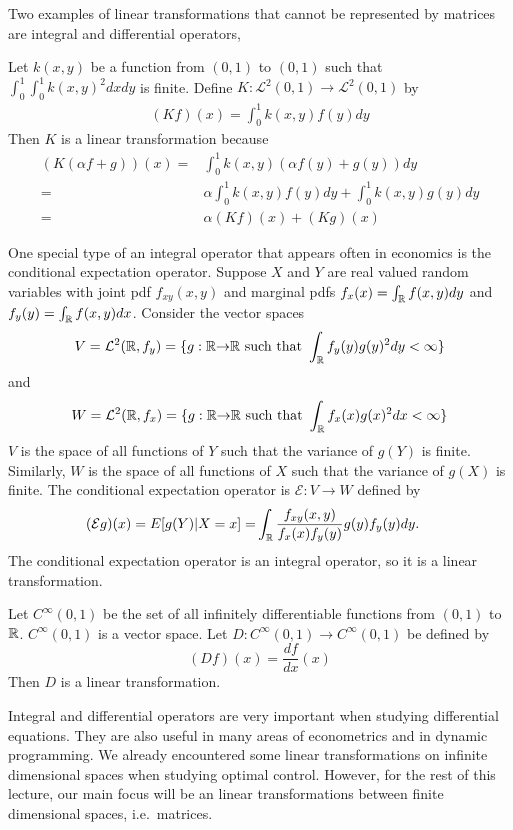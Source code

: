 Two examples of linear transformations that cannot be represented by
matrices are integral and differential operators,
\begin{example}
  Let $k(x,y)$ be a function from $(0,1)$ to $(0,1)$ such that
  $\int_0^1 \int_0^1 k(x,y)^2 dx dy$ is finite.  Define
  $K:\mathcal{L}^2(0,1) \rightarrow \mathcal{L}^2(0,1)$ by
  \begin{align*}
    (K f) (x) = \int_0^1 k(x,y) f(y) dy
  \end{align*}
  Then $K$ is a linear transformation because
  \begin{align*}
    (K ( \alpha f + g) ) (x) = & \int_0^1 k(x,y) (\alpha f(y) + g(y))dy
    \\
    = & \alpha \int_0^1 k(x,y) f(y) dy + \int_0^1 k(x,y) g(y)dy \\
    = & \alpha (K f) (x) + (K g)(x) 
  \end{align*}      
\end{example}

\begin{example}
  One special type of an integral operator that appears often in
  economics is the conditional expectation operator. Suppose $X$ and
  $Y$ are real valued random variables with joint pdf $f_{xy}(x,y)$
  and marginal pdfs $f_x(x) = \int_{\mathbb{R}} f(x,y) dy$ and $f_y(y) = \int_{\mathbb{R}}
  f(x,y) dx$. Consider the vector spaces 
  \[ 
  V = \mathcal{L}^2(\mathbb{R},f_y) = \{g:
  \mathbb{R} {\rightarrow} \mathbb{R} \text{ such that } \int_{\mathbb{R}} f_y(y) g(y)^2 dy <
  \infty \} \]
  and 
  \[ 
  W = \mathcal{L}^2(\mathbb{R},f_x) = \{g:
  \mathbb{R} {\rightarrow} \mathbb{R} \text{ such that } \int_{\mathbb{R}} f_x(x) g(x)^2 dx <
  \infty \} 
  \]  
  $V$ is the space of all functions of $Y$ such that the variance of
  $g(Y)$ is finite. Similarly, $W$ is the space of all functions of
  $X$ such that the variance of $g(X)$ is finite. 
  The conditional expectation operator is $\mathcal{E}: V \to W$
  defined by 
  \begin{align*}
    (\mathcal{E} g)(x) = E[g(Y) | X = x] = & \int_{\mathbb{R}}
    \frac{f_{xy}(x,y)}{f_x(x) f_y(y)} g(y) f_y(y) dy.
  \end{align*}
  The conditional expectation operator is an integral operator, so it
  is a linear transformation. 
\end{example}

\begin{example}
  Let $C^\infty(0,1)$ be the set of all infinitely differentiable
  functions from $(0,1)$ to $\mathbb{R}$. $C^\infty(0,1)$ is a vector space.
  Let $D:C^\infty(0,1) \rightarrow C^\infty(0,1)$ be defined by
  \[ (D f) (x) = \frac{d f}{dx}(x) \]
  Then $D$ is a linear transformation.
\end{example}
Integral and differential operators are very important when studying
differential equations.  They are also useful in many areas of
econometrics and in dynamic programming. We already encountered some linear
transformations on infinite dimensional spaces when studying optimal
control. However, for the rest of this lecture, our main focus will be
an linear transformations between finite dimensional spaces,
i.e.\ matrices. 

